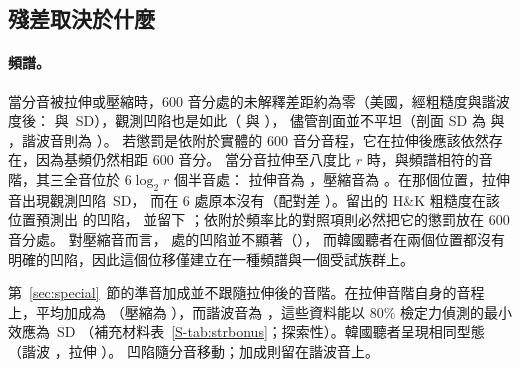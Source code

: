 \documentclass[11pt,a4paper]{article}
\newcommand{\HK}{H\&K}
\newcommand{\SDu}{\,SD}
\begin{document}
\begin{table}[t]
\centering
\caption{留出差距的分解（探索性；\HK{} + 20 音分諧波度 + 音程大小），逐一諧波頻譜 [受試者自助法信賴區間]，
以及以隨機效應合併 [Hartung--Knapp 信賴區間]。加成部分 $b(8)-b(6)$；基線部分 $q(8)-q(6)$；
階躍：扣除線性趨勢後，基線在 7 與 8 個半音之間的上升；其他 $-$ TT：其他音程的平均加成減去三全音的加成。
粗體：信賴區間排除零。吉他與鋼琴使用代用頻譜。}
\label{tab:decomp}
\footnotesize
\setlength{\tabcolsep}{3pt}
\end{table}

\subsection{殘差取決於什麼}
\label{sec:tests}

\paragraph{頻譜。}
當分音被拉伸或壓縮時，600 音分處的未解釋差距約為零（美國，經粗糙度與諧波度後：
\gapHKHStr{} 與 \gapHKHComp\SDu），觀測凹陷也是如此（\dipObsStr{} 與 \dipObsComp），
儘管剖面並不平坦（剖面 SD 為 \profSDStr{} 與 \profSDComp，諧波音則為 \profSDHarm）。
若懲罰是依附於實體的 600 音分音程，它在拉伸後應該依然存在，因為基頻仍然相距 600 音分。
當分音拉伸至八度比 $r$ 時，與頻譜相符的音階，其三全音位於 $6\log_2 r$ 個半音處：
拉伸音為 \sscPosStr{}，壓縮音為 \sscPosComp。在那個位置，拉伸音出現觀測凹陷 \sscObsDipStr\SDu，
而在 6 處原本沒有（配對差 \sscObsDipStrDiff）。留出的 \HK{} 粗糙度在該位置預測出 \mbStrPredHK{} 的凹陷，
並留下 \mbStrSscHK{} \mbStrSscHKCI；依附於頻率比的對照項則必然把它的懲罰放在 600 音分處。
對壓縮音而言，\sscPosComp{} 處的凹陷並不顯著（\sscObsDipComp），
而韓國聽者在兩個位置都沒有明確的凹陷，因此這個位移僅建立在一種頻譜與一個受試族群上。

第~\ref{sec:special}~節的準音加成並不跟隨拉伸後的音階。在拉伸音階自身的音程上，平均加成為 \sbOwnStr{}
（壓縮為 \sbOwnComp），而諧波音為 \sbOwnHarm，這些資料能以 80\% 檢定力偵測的最小效應為 \sbMdeStr\SDu{}
（補充材料表~\ref{S-tab:strbonus}；探索性）。韓國聽者呈現相同型態（諧波 \sbOwnHarmKr，拉伸 \sbOwnStrKr）。
凹陷隨分音移動；加成則留在諧波音上。
\end{document}
